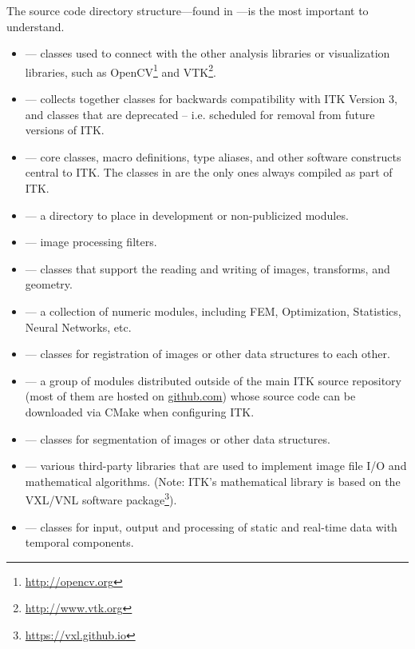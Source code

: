 The source code directory structure---found in ---is
the most important to understand.
\begin{itemize}
        \item {} --- classes used to connect with the
        other analysis libraries or visualization libraries, such as
        OpenCV\footnote{\url{http://opencv.org}} and
        VTK\footnote{\url{http://www.vtk.org}}.
        \item {} --- collects together classes
        for backwards compatibility with ITK Version 3, and classes that are
        deprecated -- i.e. scheduled for removal from future versions of ITK.
        \item {} --- core classes, macro definitions,
        type aliases, and other software constructs central to ITK. The classes
        in  are the only ones always compiled as part of ITK.
        \item {} --- a directory to place in development
        or non-publicized modules.
        \item {} --- image processing filters.
        \item {} --- classes that support the reading
        and writing of images, transforms, and geometry.
        \item {} --- a collection of numeric modules, including
        FEM, Optimization, Statistics, Neural Networks, etc.
        \item {} --- classes for registration of
        images or other data structures to each other.
        \item {} --- a group of modules distributed outside
        of the main ITK source repository (most of them are hosted on \url{github.com})
        whose source code can be downloaded via CMake when configuring ITK.
        \item {} --- classes for segmentation of
        images or other data structures.
        \item {} --- various third-party libraries
        that are used to implement image file I/O and mathematical algorithms.
        (Note: ITK's mathematical library is based
        on the VXL/VNL software
        package\footnote{\url{https://vxl.github.io}}).
        \item {} --- classes for input, output and processing
        of static and real-time data with temporal components.
\end{itemize}

